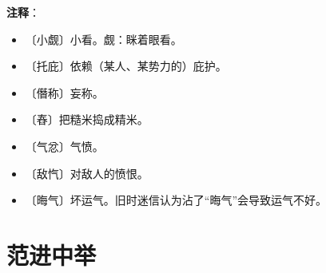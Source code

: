 \documentclass[12pt,UTF-8,openany]{ctexbook}
\begin{document}
\newpage

\textbf{注释}：

\vspace{-1em}

\begin{itemize}
    \setlength\itemsep{-0.2em}
    \item 〔小觑〕小看。觑：眯着眼看。
    \item 〔托庇〕依赖（某人、某势力的）庇护。
    \item 〔僭称〕妄称。
    \item 〔舂〕把糙米捣成精米。
    \item 〔气忿〕气愤。
    \item 〔敌忾〕对敌人的愤恨。
    \item 〔晦气〕坏运气。旧时迷信认为沾了“晦气”会导致运气不好。
\end{itemize}

\chapter{范进中举}
\end{document}
